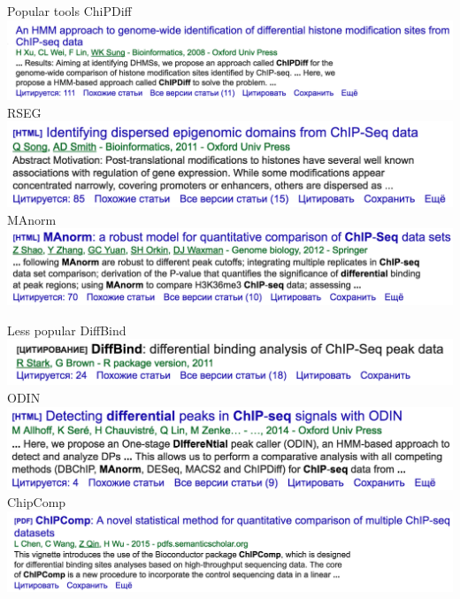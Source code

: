 \documentclass{beamer}
\begin{document}
\begin{frame}{Popular tools}
ChiPDiff\\
\includegraphics[width=\linewidth]{ChipDiff.png}\\
RSEG\\
\includegraphics[width=\linewidth]{RSEG.png}\\
MAnorm\\
\includegraphics[width=\linewidth]{MAnorm.png}\\
\end{frame}

\begin{frame}{Less popular}
DiffBind\\
\includegraphics[width=\linewidth]{DiffBind.png}\\
ODIN\\
\includegraphics[width=\linewidth]{ODIN.png}\\
ChipComp\\
\includegraphics[width=\linewidth]{ChipComp.png}\\
\end{frame}
\end{document}
